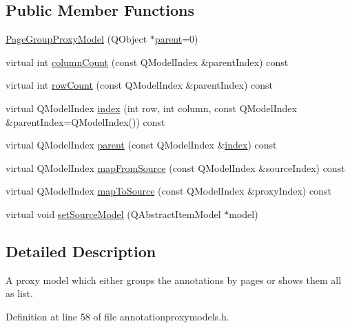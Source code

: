 \subsection*{Public Member Functions}
\begin{DoxyCompactItemize}
\item 
\hyperlink{classPageGroupProxyModel_a5ec21d44066b02b15a05e823625d4af9}{Page\+Group\+Proxy\+Model} (Q\+Object $\ast$\hyperlink{classPageGroupProxyModel_a2c0c75afdf7af4ba81eb54c685881297}{parent}=0)
\item 
virtual int \hyperlink{classPageGroupProxyModel_aa1cc463f5add3674fdc60d3412a9dda1}{column\+Count} (const Q\+Model\+Index \&parent\+Index) const 
\item 
virtual int \hyperlink{classPageGroupProxyModel_a0533049256d9b6974d7e163f0e8ac192}{row\+Count} (const Q\+Model\+Index \&parent\+Index) const 
\item 
virtual Q\+Model\+Index \hyperlink{classPageGroupProxyModel_a35de5fed8fc5a267609c9a9c08a81437}{index} (int row, int column, const Q\+Model\+Index \&parent\+Index=Q\+Model\+Index()) const 
\item 
virtual Q\+Model\+Index \hyperlink{classPageGroupProxyModel_a2c0c75afdf7af4ba81eb54c685881297}{parent} (const Q\+Model\+Index \&\hyperlink{classPageGroupProxyModel_a35de5fed8fc5a267609c9a9c08a81437}{index}) const 
\item 
virtual Q\+Model\+Index \hyperlink{classPageGroupProxyModel_a6599c15a04c0943574ed7a0be85fe623}{map\+From\+Source} (const Q\+Model\+Index \&source\+Index) const 
\item 
virtual Q\+Model\+Index \hyperlink{classPageGroupProxyModel_aa27b8c666eb1cbbf817c7512eb6365f2}{map\+To\+Source} (const Q\+Model\+Index \&proxy\+Index) const 
\item 
virtual void \hyperlink{classPageGroupProxyModel_a74886d438455adbaf72c0face4baf655}{set\+Source\+Model} (Q\+Abstract\+Item\+Model $\ast$model)
\end{DoxyCompactItemize}


\subsection{Detailed Description}
A proxy model which either groups the annotations by pages or shows them all as list. 

Definition at line 58 of file annotationproxymodels.\+h.



